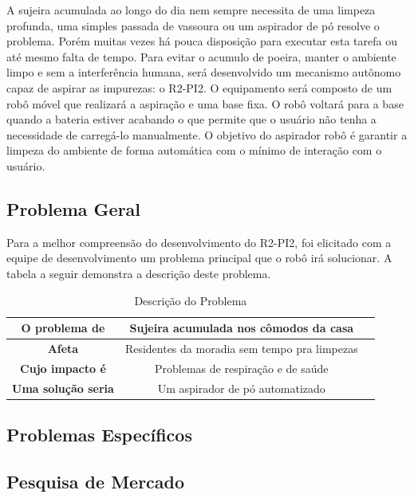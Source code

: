 A sujeira acumulada ao longo do dia nem sempre necessita de uma limpeza profunda, uma simples
passada de vassoura ou um aspirador de pó resolve o problema. Porém muitas vezes há pouca
disposição para executar esta tarefa ou até mesmo falta de tempo. Para evitar o acumulo de
poeira, manter o ambiente limpo e sem a interferência humana, será desenvolvido um mecanismo 
autônomo capaz de aspirar as impurezas: o R2-PI2. O equipamento será composto de um robô móvel que realizará a aspiração e uma base fixa. O robô voltará para a base quando a bateria estiver acabando o que permite que o usuário não tenha a necessidade de carregá-lo manualmente. O objetivo do aspirador robô é garantir a limpeza do ambiente de forma automática com o mínimo de interação com o usuário.

\subsection{Problema Geral} %
\label{sub:problemaGeral}

Para a melhor compreensão do desenvolvimento do R2-PI2, foi elicitado com a equipe de desenvolvimento um problema principal que o robô irá solucionar. A tabela a seguir demonstra a descrição deste problema.

\begin{table}[H]
	\centering
	\caption{Descrição do Problema}
	\label{tab:equipe}
	\begin{tabular}{|c|c|c|}
	\hline
	\textbf{O problema de}      &  Sujeira acumulada nos cômodos da casa \\ \hline
	\textbf{Afeta}              &  Residentes da moradia sem tempo pra limpezas\\ \hline
	\textbf{Cujo impacto é}     &  Problemas de respiração e de saúde \\ \hline
	\textbf{Uma solução seria} 	&  Um aspirador de pó automatizado \\ \hline
	\end{tabular}
	\end{table}


\subsection{Problemas Específicos} %
\label{sub:problemas_específicos}



\subsection{Pesquisa de Mercado} %
\label{sub:pesquisa_de_mercado}

